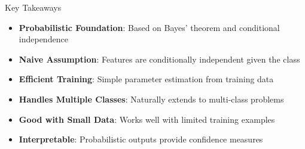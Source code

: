 \documentclass{beamer}
\begin{document}
\begin{frame}{Key Takeaways}
\begin{itemize}[<+->]
\item \textbf{Probabilistic Foundation}: Based on Bayes' theorem and conditional independence
\item \textbf{Naive Assumption}: Features are conditionally independent given the class
\item \textbf{Efficient Training}: Simple parameter estimation from training data
\item \textbf{Handles Multiple Classes}: Naturally extends to multi-class problems
\item \textbf{Good with Small Data}: Works well with limited training examples
\item \textbf{Interpretable}: Probabilistic outputs provide confidence measures
\end{itemize}
\end{frame}
\end{document}

